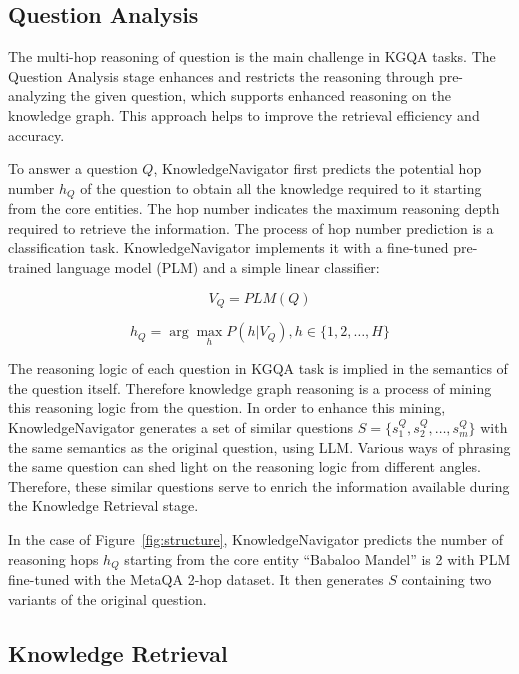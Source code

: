 \documentclass{article}
\begin{document}
\subsection{Question Analysis}


The multi-hop reasoning of question is the main challenge in KGQA tasks. The Question Analysis stage enhances and restricts the reasoning through pre-analyzing the given question, which supports enhanced reasoning on the knowledge graph. This approach helps to improve the retrieval efficiency and accuracy.

To answer a question $Q$, KnowledgeNavigator first predicts the potential hop number $h_Q$ of the question to obtain all the knowledge required to it starting from the core entities. The hop number indicates the maximum reasoning depth required to retrieve the information. The process of hop number prediction is a classification task. KnowledgeNavigator implements it with a fine-tuned pre-trained language model (PLM) and a simple linear classifier:

\begin{equation}
    V_Q = PLM(Q)
\end{equation}

\begin{equation}
    h_Q = \arg\max_{h} P(h|V_Q), h \in \{1, 2, \ldots, H\}
\end{equation}



The reasoning logic of each question in KGQA task is implied in the semantics of the question itself. Therefore knowledge graph reasoning is a process of mining this reasoning logic from the question. In order to enhance this mining, KnowledgeNavigator generates a set of similar questions $S = {\{s^Q_1, s^Q_2, \ldots, s^Q_m\}}$ with the same semantics as the original question, using LLM. Various ways of phrasing the same question can shed light on the reasoning logic from different angles. Therefore, these similar questions serve to enrich the information available during the Knowledge Retrieval stage.


In the case of Figure~\ref{fig:structure}, KnowledgeNavigator predicts the number of reasoning hops $h_Q$ starting from the core entity \enquote{Babaloo Mandel} is 2 with PLM fine-tuned with the MetaQA 2-hop dataset. It then generates $S$ containing two variants of the original question.


\subsection{Knowledge Retrieval}
\end{document}
